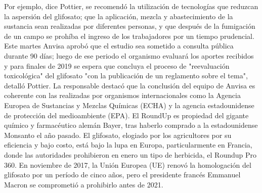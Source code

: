\documentclass{article}%
\begin{document}
\newline%
%
Por ejemplo, dice Pottier, se recomendó la utilización de tecnologías que reduzcan la aspersión del glifosato; que la aplicación, mezcla y abastecimiento de la sustancia sean realizadas por diferentes personas, y que después de la fumigación de un campo se prohíba el ingreso de los trabajadores por un tiempo prudencial.%
\newline%
%
Este martes Anvisa aprobó que el estudio sea sometido a consulta pública durante 90 días; luego de ese periodo el organismo evaluará los aportes recibidos y para finales de 2019 se espera que concluya el proceso de "reevaluación toxicológica" del glifosato "con la publicación de un reglamento sobre el tema", detalló Pottier.%
\newline%
%
La responsable destacó que la conclusión del equipo de Anvisa es coherente con las realizadas por organismos internacionales como la Agencia Europea de Sustancias y Mezclas Químicas (ECHA) y la agencia estadounidense de protección del medioambiente (EPA).%
\newline%
%
El RoundUp es propiedad del gigante químico y farmacéutico alemán Bayer, tras haberlo comprado a la estadounidense Monsanto el año pasado.%
\newline%
%
El glifosato, elogiado por los agricultores por su eficiencia y bajo costo, está bajo la lupa en Europa, particularmente en Francia, donde las autoridades prohibieron en enero un tipo de herbicida, el Roundup Pro 360.%
\newline%
%
En noviembre de 2017, la Unión Europea (UE) renovó la homologación del glifosato por un período de cinco años, pero el presidente francés Emmanuel Macron se comprometió a prohibirlo antes de 2021.%
\newline%
%
\end{document}
